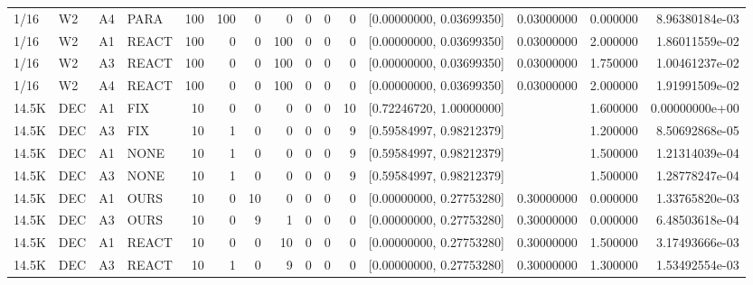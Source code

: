 \begin{tabular}{ll ll r rrrrrr l l r r}
1/16 & W2 & A4 & PARA & 100 & 100 & 0 & 0 & 0 & 0 & 0 & [0.00000000, 0.03699350] & 0.03000000 & 0.000000 & 8.96380184e-03 \\
1/16 & W2 & A1 & REACT & 100 & 0 & 0 & 100 & 0 & 0 & 0 & [0.00000000, 0.03699350] & 0.03000000 & 2.000000 & 1.86011559e-02 \\
1/16 & W2 & A3 & REACT & 100 & 0 & 0 & 100 & 0 & 0 & 0 & [0.00000000, 0.03699350] & 0.03000000 & 1.750000 & 1.00461237e-02 \\
1/16 & W2 & A4 & REACT & 100 & 0 & 0 & 100 & 0 & 0 & 0 & [0.00000000, 0.03699350] & 0.03000000 & 2.000000 & 1.91991509e-02 \\
14.5K & DEC & A1 & FIX & 10 & 0 & 0 & 0 & 0 & 0 & 10 & [0.72246720, 1.00000000] &  & 1.600000 & 0.00000000e+00 \\
14.5K & DEC & A3 & FIX & 10 & 1 & 0 & 0 & 0 & 0 & 9 & [0.59584997, 0.98212379] &  & 1.200000 & 8.50692868e-05 \\
14.5K & DEC & A1 & NONE & 10 & 1 & 0 & 0 & 0 & 0 & 9 & [0.59584997, 0.98212379] &  & 1.500000 & 1.21314039e-04 \\
14.5K & DEC & A3 & NONE & 10 & 1 & 0 & 0 & 0 & 0 & 9 & [0.59584997, 0.98212379] &  & 1.500000 & 1.28778247e-04 \\
14.5K & DEC & A1 & OURS & 10 & 0 & 10 & 0 & 0 & 0 & 0 & [0.00000000, 0.27753280] & 0.30000000 & 0.000000 & 1.33765820e-03 \\
14.5K & DEC & A3 & OURS & 10 & 0 & 9 & 1 & 0 & 0 & 0 & [0.00000000, 0.27753280] & 0.30000000 & 0.000000 & 6.48503618e-04 \\
14.5K & DEC & A1 & REACT & 10 & 0 & 0 & 10 & 0 & 0 & 0 & [0.00000000, 0.27753280] & 0.30000000 & 1.500000 & 3.17493666e-03 \\
14.5K & DEC & A3 & REACT & 10 & 1 & 0 & 9 & 0 & 0 & 0 & [0.00000000, 0.27753280] & 0.30000000 & 1.300000 & 1.53492554e-03 \\
\hline
\end{tabular}
